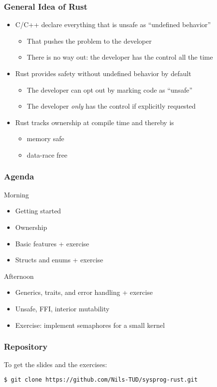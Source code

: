 \begin{frame}
    \frametitle{General Idea of Rust}

    \begin{itemize}
        \item C/C++ declare everything that is unsafe as ``undefined behavior''
        \begin{itemize}
            \item That pushes the problem to the developer
            \item There is no way out: the developer has the control all the time
        \end{itemize}

        \pause

        \item Rust provides safety without undefined behavior by default
        \begin{itemize}
            \item The developer can opt out by marking code as ``unsafe''
            \item The developer \emph{only} has the control if explicitly requested
        \end{itemize}

        \pause

        \item Rust tracks ownership at compile time and thereby is
        \begin{itemize}
            \item memory safe
            \item data-race free
        \end{itemize}
    \end{itemize}
\end{frame}

\begin{frame}
    \frametitle{Agenda}

    \begin{block}{Morning}
    \begin{itemize}
        \item Getting started
        \item Ownership
        \item Basic features + exercise
        \item Structs and enums + exercise
    \end{itemize}
    \end{block}

    \pause

    \begin{block}{Afternoon}
    \begin{itemize}
        \item Generics, traits, and error handling + exercise
        \item Unsafe, FFI, interior mutability
        \item Exercise: implement semaphores for a small kernel
    \end{itemize}
    \end{block}
\end{frame}

\begin{frame}[fragile]
    \frametitle{Repository}

    \Large
    To get the slides and the exercises:
    \begin{lstlisting}[language=bash,basicstyle=\large\ttfamily]
    $ git clone https://github.com/Nils-TUD/sysprog-rust.git
    \end{lstlisting}
\end{frame}

